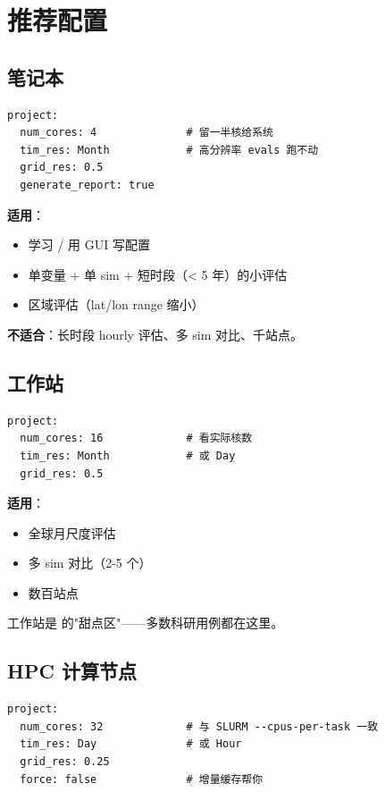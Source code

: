 \section{推荐配置}

\subsection{笔记本}

\begin{verbatim}
project:
  num_cores: 4              # 留一半核给系统
  tim_res: Month            # 高分辨率 evals 跑不动
  grid_res: 0.5
  generate_report: true
\end{verbatim}

\textbf{适用}：

\begin{itemize}
  \item 学习 \openbench{} / 用 GUI 写配置
  \item 单变量 + 单 sim + 短时段（< 5 年）的小评估
  \item 区域评估（lat/lon range 缩小）
\end{itemize}

\textbf{不适合}：长时段 hourly 评估、多 sim 对比、千站点。

\subsection{工作站}

\begin{verbatim}
project:
  num_cores: 16             # 看实际核数
  tim_res: Month            # 或 Day
  grid_res: 0.5
\end{verbatim}

\textbf{适用}：

\begin{itemize}
  \item 全球月尺度评估
  \item 多 sim 对比（2-5 个）
  \item 数百站点
\end{itemize}

工作站是 \openbench{} 的"甜点区"——多数科研用例都在这里。

\subsection{HPC 计算节点}

\begin{verbatim}
project:
  num_cores: 32             # 与 SLURM --cpus-per-task 一致
  tim_res: Day              # 或 Hour
  grid_res: 0.25
  force: false              # 增量缓存帮你
\end{verbatim}

